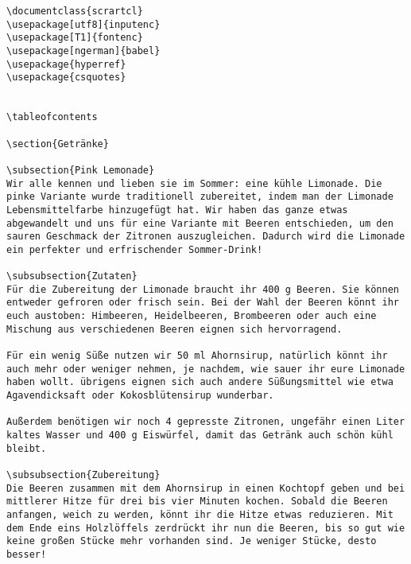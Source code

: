 \begin{verbatim}
\documentclass{scrartcl}
\usepackage[utf8]{inputenc}
\usepackage[T1]{fontenc}
\usepackage[ngerman]{babel}
\usepackage{hyperref}
\usepackage{csquotes}
	

\tableofcontents
	
\section{Getränke}
	
\subsection{Pink Lemonade}
Wir alle kennen und lieben sie im Sommer: eine kühle Limonade. Die pinke Variante wurde traditionell zubereitet, indem man der Limonade Lebensmittelfarbe hinzugefügt hat. Wir haben das ganze etwas abgewandelt und uns für eine Variante mit Beeren entschieden, um den sauren Geschmack der Zitronen auszugleichen. Dadurch wird die Limonade ein perfekter und erfrischender Sommer-Drink!
	
\subsubsection{Zutaten}
Für die Zubereitung der Limonade braucht ihr 400 g Beeren. Sie können entweder gefroren oder frisch sein. Bei der Wahl der Beeren könnt ihr euch austoben: Himbeeren, Heidelbeeren, Brombeeren oder auch eine Mischung aus verschiedenen Beeren eignen sich hervorragend. 
	
Für ein wenig Süße nutzen wir 50 ml Ahornsirup, natürlich könnt ihr auch mehr oder weniger nehmen, je nachdem, wie sauer ihr eure Limonade haben wollt. übrigens eignen sich auch andere Süßungsmittel wie etwa Agavendicksaft oder Kokosblütensirup wunderbar.
	
Außerdem benötigen wir noch 4 gepresste Zitronen, ungefähr einen Liter kaltes Wasser und 400 g Eiswürfel, damit das Getränk auch schön kühl bleibt.
	
\subsubsection{Zubereitung}
Die Beeren zusammen mit dem Ahornsirup in einen Kochtopf geben und bei mittlerer Hitze für drei bis vier Minuten kochen. Sobald die Beeren anfangen, weich zu werden, könnt ihr die Hitze etwas reduzieren. Mit dem Ende eins Holzlöffels zerdrückt ihr nun die Beeren, bis so gut wie keine großen Stücke mehr vorhanden sind. Je weniger Stücke, desto besser!
	

\end{verbatim}
